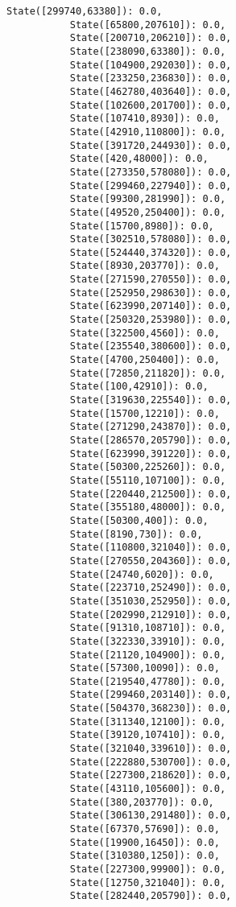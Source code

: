 \documentclass[11pt]{article}
\begin{document}
\begin{Verbatim}[commandchars=\\\{\}]
           State([299740,63380]): 0.0,
           State([65800,207610]): 0.0,
           State([200710,206210]): 0.0,
           State([238090,63380]): 0.0,
           State([104900,292030]): 0.0,
           State([233250,236830]): 0.0,
           State([462780,403640]): 0.0,
           State([102600,201700]): 0.0,
           State([107410,8930]): 0.0,
           State([42910,110800]): 0.0,
           State([391720,244930]): 0.0,
           State([420,48000]): 0.0,
           State([273350,578080]): 0.0,
           State([299460,227940]): 0.0,
           State([99300,281990]): 0.0,
           State([49520,250400]): 0.0,
           State([15700,8980]): 0.0,
           State([302510,578080]): 0.0,
           State([524440,374320]): 0.0,
           State([8930,203770]): 0.0,
           State([271590,270550]): 0.0,
           State([252950,298630]): 0.0,
           State([623990,207140]): 0.0,
           State([250320,253980]): 0.0,
           State([322500,4560]): 0.0,
           State([235540,380600]): 0.0,
           State([4700,250400]): 0.0,
           State([72850,211820]): 0.0,
           State([100,42910]): 0.0,
           State([319630,225540]): 0.0,
           State([15700,12210]): 0.0,
           State([271290,243870]): 0.0,
           State([286570,205790]): 0.0,
           State([623990,391220]): 0.0,
           State([50300,225260]): 0.0,
           State([55110,107100]): 0.0,
           State([220440,212500]): 0.0,
           State([355180,48000]): 0.0,
           State([50300,400]): 0.0,
           State([8190,730]): 0.0,
           State([110800,321040]): 0.0,
           State([270550,204360]): 0.0,
           State([24740,6020]): 0.0,
           State([223710,252490]): 0.0,
           State([351030,252950]): 0.0,
           State([202990,212910]): 0.0,
           State([91310,108710]): 0.0,
           State([322330,33910]): 0.0,
           State([21120,104900]): 0.0,
           State([57300,10090]): 0.0,
           State([219540,47780]): 0.0,
           State([299460,203140]): 0.0,
           State([504370,368230]): 0.0,
           State([311340,12100]): 0.0,
           State([39120,107410]): 0.0,
           State([321040,339610]): 0.0,
           State([222880,530700]): 0.0,
           State([227300,218620]): 0.0,
           State([43110,105600]): 0.0,
           State([380,203770]): 0.0,
           State([306130,291480]): 0.0,
           State([67370,57690]): 0.0,
           State([19900,16450]): 0.0,
           State([310380,1250]): 0.0,
           State([227300,99900]): 0.0,
           State([12750,321040]): 0.0,
           State([282440,205790]): 0.0,

\end{Verbatim}
\end{document}
